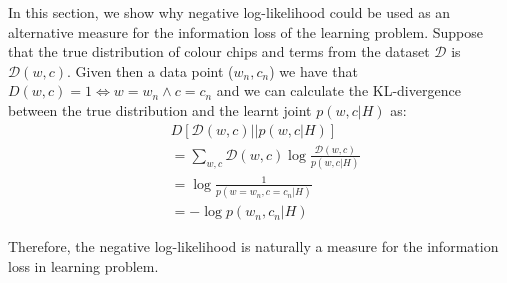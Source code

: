 \documentclass[11pt]{article}
\begin{document}
In this section, we show why negative log-likelihood could be used as an alternative measure for the information loss of the learning problem. Suppose that the true distribution of colour chips and terms from the dataset $\mathcal{D}$ is $\mathcal{D}(w,c)$. Given then a data point ($w_n,c_n$) we have that $D(w,c)=1 \iff w=w_n \land c=c_n$ and we can calculate the KL-divergence between the true distribution and the learnt joint $p(w,c|H)$ as:
\begin{equation}
    \begin{split}
        & D[\mathcal{D}(w,c)||p(w,c|H)] \\ 
        & = \sum_{w,c} \mathcal{D}(w,c)\log \frac{\mathcal{D}(w,c)}{p(w,c|H)} \\
        & = \log \frac{1}{p(w=w_n,c=c_n|H)} \\
        & = -\log p(w_n,c_n|H)
    \end{split}
    \label{eq:learn_info_loss}
\end{equation}

Therefore, the negative log-likelihood is naturally a measure for the information loss in learning problem.
\end{document}
